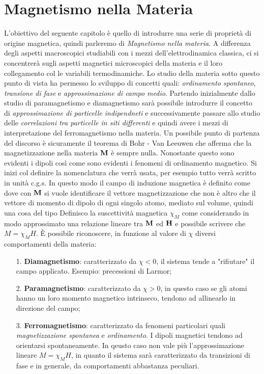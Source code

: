 \documentclass[a4paper,12pt]{article}
\begin{document}
\section{Magnetismo nella Materia}
L'obiettivo del seguente capitolo è quello di introdurre una serie di proprietà di origine magnetica, quindi parleremo di \textit{Magnetismo nella materia}. A differenza degli aspetti macroscopici studiabili con i mezzi dell'elettrodinamica classica, ci si concentrerà sugli aspetti magnetici microscopici della materia e il loro collegamento col le variabili termodinamiche. Lo studio della materia sotto questo punto di vista ha permesso lo sviluppo di concetti quali: \textit{ordinamento spontaneo}, \textit{transione di fase} e \textit{approssimazione di campo medio}.
Partendo inizialmente dallo studio di paramagnetismo e diamagnetismo sarà possibile introdurre il concetto di \textit{approssimazione di particelle indipendneti} e successivamente passare allo studio delle \textit{correlazioni tra particelle in siti differenti} e quindi avere i mezzi di interpretazione del ferromagnetismo nella materia. Un possibile punto di partenza del discorso è sicuramente il teorema di Bohr - Van Leeuwen che afferma che la magnetizzazione nella materia ${\it\bf M}$ è sempre nulla. Nonostante questo sono evidenti i dipoli così come sono evidenti i fenomeni di ordinamento magnetico. Si inizi col definire la nomenclatura che verrà usata, per esempio tutto verrà scritto in unità c.g.s. In questo modo il campo di induzione magnetica è definito come
dove con ${\it\bf M}$ si vuole identificare il vettore magnetizzazione che non è altro che il vettore di momento di dipolo di ogni singolo atomo, mediato sul volume, quindi una cosa del tipo
Definisco la suscettività magnetica $\chi_M$ come 
considerando in modo approssimato una relazione lineare tra $\it\bf M$ ed $\it\bf H$ e possibile scrivere che $M = \chi_M H$. \`E possibile riconoscere, in funzione al valore di $\chi$ diversi comportamenti della materia:
\begin{itemize}
	\item[1.] \textbf{Diamagnetismo}: caratterizzato da $\chi<0$, il sistema tende a "rifiutare" il campo applicato. Esempio: precessioni di Larmor;
	\item[2.] \textbf{Paramagnetismo}: caratterizzato da $\chi>0$, in questo caso se gli  atomi hanno un loro momento magnetico intrinseco, tendono ad allinearlo in direzione del campo;
	\item[3.] \textbf{Ferromagnetismo}: caratterizzato da fenomeni particolari quali \textit{magnetizzazione spontanea} e \textit{ordinamento}. I dipoli magnetici tendono ad orientarsi spontaneamente. In qeusto caso non vale più l'approssimazione lineare $M = \chi_M H$, in quanto il sistema sarà caratterizzato da transizioni di fase e in generale, da comportamenti abbastanza peculiari.
\end{itemize}
\end{document}
